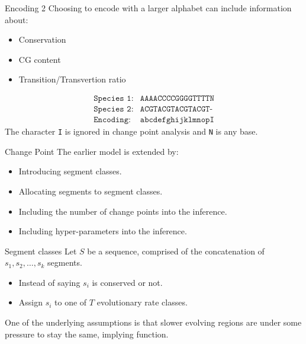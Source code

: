 \documentclass{beamer}
\begin{document}
    \begin{frame}{Encoding 2}
    Choosing to encode with a larger alphabet can include information about:
        \begin{itemize}
            \item Conservation
            \item CG content
            \item Transition/Transvertion ratio
        \end{itemize}
        \begin{align*}
            \texttt{Species 1:}&\texttt{AAAACCCCGGGGTTTTN}\\
            \texttt{Species 2:}&\texttt{ACGTACGTACGTACGT-}\\
            \texttt{Encoding:}&\texttt{abcdefghijklmnopI}
        \end{align*}
    The character \texttt{I} is ignored in change point analysis and \texttt{N} is any base.
    \end{frame}
    
    \begin{frame}{Change Point}
    The earlier model is extended by:
        \begin{itemize}
            \item Introducing segment classes. 
            \item Allocating segments to segment classes.
            \item Including the number of change points into the inference.
            \item Including hyper-parameters into the inference.
        \end{itemize}
    \end{frame}
    
    \begin{frame}{Segment classes}
        Let $S$ be a sequence, comprised of the concatenation of $s_1,s_2,\ldots,s_k$ segments. 
        
            \begin{itemize}
                \item Instead of saying $s_i$ is conserved or not.
                \item Assign $s_i$ to one of $T$ evolutionary rate classes.
            \end{itemize}
        One of the underlying assumptions is that slower evolving regions are under some pressure to stay the same, implying function.
    \end{frame}
    
\end{document}
